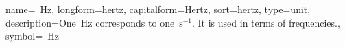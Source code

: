 %
{
    name={\protect\si{\protect\hertz}},
    longform={hertz},
    capitalform={Hertz},
    sort={hertz},
    type={unit},
    description={One~\si{\hertz} corresponds to one~$\si{\second}^{-1}$. It
    is used in terms of frequencies.},
    symbol={\protect\si{\protect\hertz}}
}

% 


